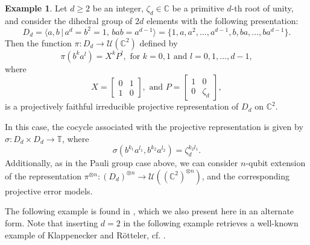 \documentclass[11pt]{article}
\theoremstyle{definition}
\newtheorem{example}{Example}
\newcommand{\bbC}{\mathbb{C}}
\newcommand{\calU}{\mathcal{U}}
\begin{document}
\begin{example}\label{example:XP-projective error model}
    Let $d \geq 2$ be an integer, $\zeta_d \in \bbC$ be a primitive $d$-th root of unity, and consider the dihedral group of $2d$ elements with the following presentation:
    \begin{equation*}
        D_d 
        = \langle a,b \, \vert \, a^d = b^2 = 1, \, bab = a^{d-1} \rangle 
        = \{ 1, a, a^2, \dots, a^{d-1}, b, ba, \dots, ba^{d-1} \}.
    \end{equation*}
    Then the function $\pi \colon D_d \to \calU(\bbC^2)$ defined by
    \begin{equation}\label{xpexample}
        \pi(b^ka^l) = X^k P^l, \text{ for } k = 0,1 \text{ and } l = 0,1,\dots,d-1,
    \end{equation}
    where 
    \begin{equation*}
        X =
        \begin{bmatrix}
            0 & 1 \\
            1 & 0
        \end{bmatrix},
        \text{ and }
        P =
        \begin{bmatrix}
            1 & 0 \\
            0 & \zeta_d
        \end{bmatrix},
    \end{equation*}
    is a projectively faithful irreducible projective representation of $D_d$ on $\bbC^2$.

In this case, the cocycle associated with the projective representation is given by $\sigma: D_d \times D_d \to \mathbb T$, where 
\[
\sigma ( b^{k_1} a^{l_1} , b^{k_2} a^{l_2}  )  = \zeta_d^{k_2 l_1}. 
\]
    Additionally, as in the Pauli group case above, we can consider $n$-qubit extension of the representation $\pi^{\otimes n} \colon (D_d)^{\otimes n} \to \calU((\bbC^2)^{\otimes n})$, and the corresponding projective error models. 
\end{example}

The following example is found in \cite[Proposition 8.1]{Eidesen2025}, which we also present here in an alternate form. Note that inserting $d = 2$ in the following example retrieves a well-known example of Klappenecker and Rötteler, cf. \cite[Section 10.9]{KlappeneckerRotteler02}.
\end{document}
